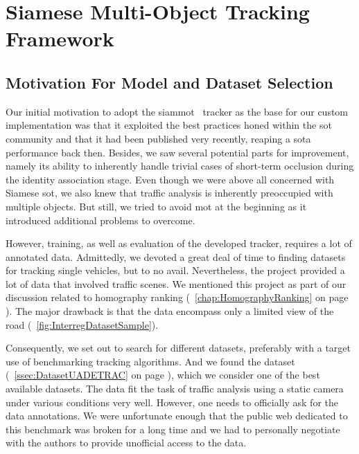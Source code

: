 \section{Siamese Multi-Object Tracking Framework}
\label{sec:SiamMOT}

\subsection{Motivation For Model and Dataset Selection}

Our initial motivation to adopt the \gls{siammot}~\cite{shuai2021siammot} tracker as the base for our custom implementation was that it exploited the best practices honed within the \gls{sot} community and that it had been published very recently, reaping a \gls{sota} performance back then. Besides, we saw several potential parts for improvement, namely its ability to inherently handle trivial cases of short-term occlusion during the identity association stage. Even though we were above all concerned with Siamese \gls{sot}, we also knew that traffic analysis is inherently preoccupied with multiple objects. But still, we tried to avoid \gls{mot} at the beginning as it introduced additional problems to overcome.

However, training, as well as evaluation of the developed tracker, requires a lot of annotated data. Admittedly, we devoted a great deal of time to finding datasets for tracking single vehicles, but to no avail. Nevertheless, the \interreg{} project provided a lot of data that involved traffic scenes. We mentioned this project as part of our discussion related to homography ranking (\chaptertext{}~\ref{chap:HomographyRanking} on page \pageref{chap:HomographyRanking}). The major drawback is that the data encompass only a limited view of the road (\figtext{}~\ref{fig:InterregDatasetSample}).

Consequently, we set out to search for different datasets, preferably with a target use of benchmarking tracking algorithms. And we found the \uadetrac{} dataset (\sectiontext{}~\ref{ssec:DatasetUADETRAC} on page \pageref{ssec:DatasetUADETRAC}), which we consider one of the best available datasets. The data fit the task of traffic analysis using a static camera under various conditions very well. However, one needs to officially ask for the data annotations. We were unfortunate enough that the public web dedicated to this benchmark was broken for a long time and we had to personally negotiate with the authors to provide unofficial access to the data.

